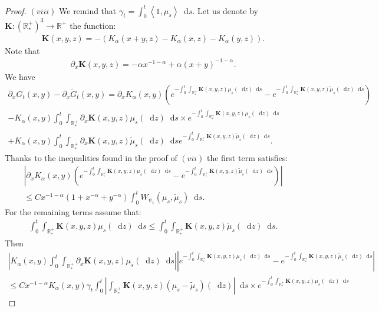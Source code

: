 \documentclass[11pt,a4paper]{article}
\newcommand{\RR}{\mathbb{R}}
\newcommand{\RRP}{\mathbb{R}^+_*}
\newcommand{\brac}[1]{\left\langle#1\right\rangle}
\newcommand{\dd}{\mathop{}\!\mathrm{d}}
\begin{document}
\begin{proof}
    $(viii)$ We remind that $\gamma_t = \int_0^t \brac{1,\mu_s} \dd s$. Let us denote by $\mathbf{K} : \left(\RRP\right)^3 \to \RR^+$ the function:
    \begin{align*}
        \mathbf{K}(x,y,z) = -\left(K_\alpha(x+y,z) - K_\alpha(x,z) -K_\alpha(y,z)\right).
    \end{align*}
    Note that
    \begin{align*}
        \partial_x \mathbf{K}(x,y,z) = -\alpha x^{-1-\alpha}  + \alpha (x + y)^{-1-\alpha}.
    \end{align*}
    We have 
    \begin{multline*}
        \partial_x G_t(x,y)- \partial_x \tilde{G}_t(x,y) = \partial_x K_\alpha(x,y) \left( e^{-\int_0^t \int_{\RRP}\mathbf{K}(x,y,z)\mu_s(\dd z) \dd s} 
        -  e^{-\int_0^t \int_{\RRP}\mathbf{K}(x,y,z)\tilde{\mu}_s(\dd z) \dd s} \right) \\
        - K_\alpha(x,y) \int_0^t \int_{\RRP} \partial_x \mathbf{K}(x,y,z)\mu_s(\dd z) \dd s \times e^{-\int_0^t \int_{\RRP}\mathbf{K}(x,y,z)\mu_s(\dd z) \dd s} \\
        + K_\alpha(x,y)\int_0^t \int_{\RRP}\partial_x \mathbf{K}(x,y,z)\tilde{\mu}_s(\dd z) \dd s e^{-\int_0^t \int_{\RRP}\mathbf{K}(x,y,z)\tilde{\mu}_s(\dd z) \dd s}.
    \end{multline*}
    Thanks to the inequalities found in the proof of $(vii)$ the first term satisfies:
    \begin{multline*}
        \left| \partial_x K_\alpha(x,y) \left( e^{-\int_0^t \int_{\RRP}\mathbf{K}(x,y,z)\mu_s(\dd z) \dd s} 
        -  e^{-\int_0^t \int_{\RRP}\mathbf{K}(x,y,z)\tilde{\mu}_s(\dd z) \dd s} \right)\right| \\
         \leq C x^{-1-\alpha} (1 + x^{-\alpha} + y^{-\alpha}) \int_0^t W_{\psi_1}(\mu_s,\tilde{\mu}_s) \dd s.
    \end{multline*}
    For the remaining terms assume that:
    \begin{align*}
        \int_0^t \int_{\RRP}\mathbf{K}(x,y,z)\mu_s(\dd z) \dd s \leq \int_0^t \int_{\RRP}\mathbf{K}(x,y,z)\tilde{\mu}_s(\dd z) \dd s.
    \end{align*}
    Then
    \begin{multline*}
        \left| K_\alpha(x,y) \int_0^t \int_{\RRP} \partial_x \mathbf{K}(x,y,z)\mu_s(\dd z) \dd s \right|
        \left|e^{-\int_0^t \int_{\RRP}\mathbf{K}(x,y,z)\mu_s(\dd z) \dd s} - e^{-\int_0^t \int_{\RRP}\mathbf{K}(x,y,z)\tilde{\mu}_s(\dd z) \dd s}\right| \\
        \leq C x^{-1-\alpha} K_\alpha(x,y) \gamma_t  \int_0^t \left| \int_{\RRP}\mathbf{K}(x,y,z)(\mu_s-\tilde{\mu}_s)(\dd z) \right| \dd s \times e^{-\int_0^t \int_{\RRP}\mathbf{K}(x,y,z)\mu_s(\dd z) \dd s}

\end{multline*}
\end{proof}
\end{document}
